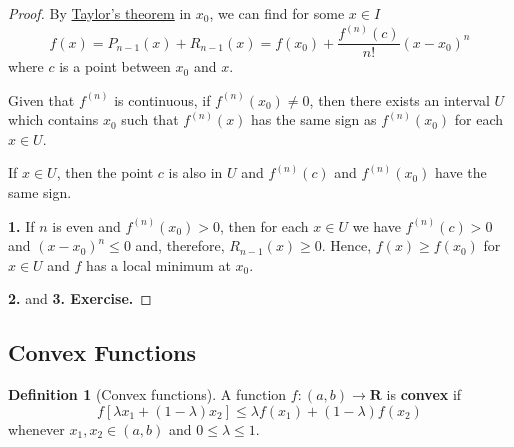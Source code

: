 \documentclass[tikz,12pt,a4paper]{article}
\theoremstyle{definition}
\newtheorem{definition}{Definition}[section]
\begin{document}
\begin{proof}
	By \hyperref[thm:taylor]{Taylor's theorem} in $x_0$, we can find for some $x \in I$
	\[
		f(x) = P_{n-1}(x) + R_{n-1}(x) = f(x_0) + \frac{f^{(n)}(c)}{n!} (x - x_0)^n 
	\]
	where $c$ is a point between $x_0$ and $x$.

	Given that $f^{(n)}$ is continuous, if $f^{(n)}(x_0) \neq 0$, then there exists an interval $U$ which contains $x_0$ such that $f^{(n)}(x)$ has the same sign as $f^{(n)}(x_0)$ for each $x \in U$.

	If $x \in U$, then the point $c$ is also in $U$ and $f^{(n)}(c)$ and $f^{(n)}(x_0)$ have the same sign.

	\textbf{1.} If $n$ is even and $f^{(n)}(x_0) > 0$, then for each $x \in U$ we have $f^{(n)}(c) > 0$ and $(x - x_0)^n \leq 0$ and, therefore, $R_{n-1}(x) \geq 0$. Hence, $f(x) \geq f(x_0)$ for $x \in U$ and $f$ has a local minimum at $x_0$.

	\textbf{2.} and \textbf{3. Exercise.}
\end{proof}

\subsection{Convex Functions}

\begin{definition}[Convex functions]
	A function $f : (a,b) \longrightarrow \textbf{R}$ is \textbf{convex} if
	\[
		f[\lambda x_1 + (1-\lambda)x_2] \leq \lambda f(x_1) + (1-\lambda) f(x_2)
	\]
	whenever $x_1, x_2 \in (a,b)$ and $0 \leq \lambda \leq 1$.
\end{definition}
\end{document}
